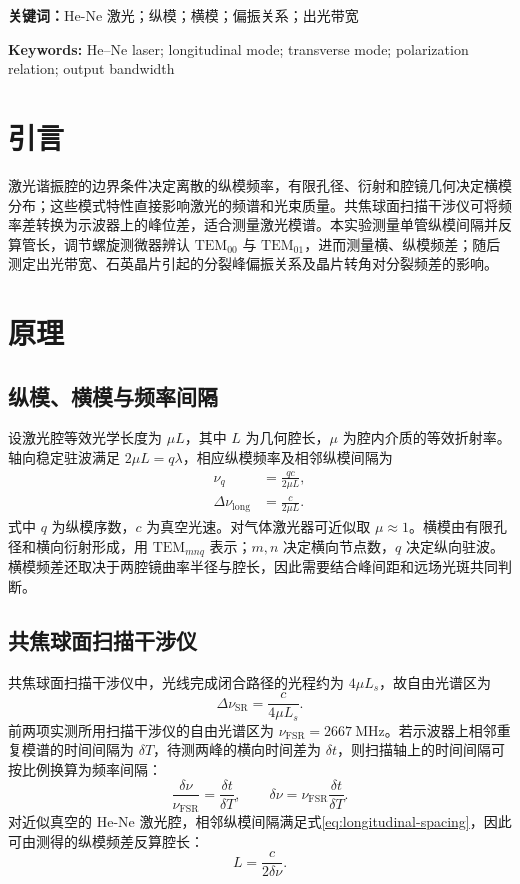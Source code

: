 \documentclass[UTF8,a4paper,10pt]{ctexart}
\begin{document}
\noindent\textbf{关键词：}He-Ne 激光；纵模；横模；偏振关系；出光带宽

\noindent\textbf{Keywords:} He--Ne laser; longitudinal mode; transverse mode; polarization relation; output bandwidth

\section{引言}

激光谐振腔的边界条件决定离散的纵模频率，有限孔径、衍射和腔镜几何决定横模分布；这些模式特性直接影响激光的频谱和光束质量。共焦球面扫描干涉仪可将频率差转换为示波器上的峰位差，适合测量激光模谱。本实验测量单管纵模间隔并反算管长，调节螺旋测微器辨认 $\mathrm{TEM}_{00}$ 与 $\mathrm{TEM}_{01}$，进而测量横、纵模频差；随后测定出光带宽、石英晶片引起的分裂峰偏振关系及晶片转角对分裂频差的影响\cite{guide}。

\section{原理}

\subsection{纵模、横模与频率间隔}

设激光腔等效光学长度为 $\mu L$，其中 $L$ 为几何腔长，$\mu$ 为腔内介质的等效折射率。轴向稳定驻波满足 $2\mu L=q\lambda$，相应纵模频率及相邻纵模间隔为
\begin{align}
  \nu_q &= \frac{qc}{2\mu L}, \label{eq:longitudinal-frequency}\\
  \Delta\nu_{\mathrm{long}} &= \frac{c}{2\mu L}. \label{eq:longitudinal-spacing}
\end{align}
式中 $q$ 为纵模序数，$c$ 为真空光速。对气体激光器可近似取 $\mu\approx1$。横模由有限孔径和横向衍射形成，用 $\mathrm{TEM}_{mnq}$ 表示；$m,n$ 决定横向节点数，$q$ 决定纵向驻波。横模频差还取决于两腔镜曲率半径与腔长，因此需要结合峰间距和远场光斑共同判断\cite{zhou}。

\subsection{共焦球面扫描干涉仪}

共焦球面扫描干涉仪中，光线完成闭合路径的光程约为 $4\mu L_s$，故自由光谱区为
\begin{equation}
  \Delta\nu_{\mathrm{SR}}=\frac{c}{4\mu L_s}. \label{eq:fsr}
\end{equation}
前两项实测所用扫描干涉仪的自由光谱区为 $\nu_{\mathrm{FSR}}=\SI{2667}{\mega\hertz}$。若示波器上相邻重复模谱的时间间隔为 $\delta T$，待测两峰的横向时间差为 $\delta t$，则扫描轴上的时间间隔可按比例换算为频率间隔：
\begin{equation}
  \frac{\delta\nu}{\nu_{\mathrm{FSR}}}
  =\frac{\delta t}{\delta T},\qquad
  \delta\nu=\nu_{\mathrm{FSR}}\frac{\delta t}{\delta T}. \label{eq:scale}
\end{equation}
对近似真空的 He-Ne 激光腔，相邻纵模间隔满足式\eqref{eq:longitudinal-spacing}，因此可由测得的纵模频差反算腔长：
\begin{equation}
  L=\frac{c}{2\delta\nu}. \label{eq:tube-length}
\end{equation}
\end{document}
